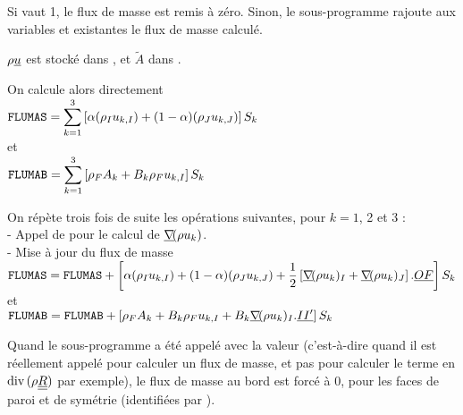 Si  vaut 1, le flux de masse est remis à zéro. Sinon, le
sous-programme rajoute aux variables  et  existantes le
flux de masse calculé.


$\rho\underline{u}$ est stocké dans , et $\tilde{A}$ dans .


On calcule alors directement\\
$\displaystyle \text{\texttt{FLUMAS}}=\sum\limits_{k=1}^{3}\left[
\alpha(\rho_I u_{k,I})+(1-\alpha)(\rho_J u_{k,J})\right]S_k$\\
et\\
$\displaystyle \text{\texttt{FLUMAB}}=\sum\limits_{k=1}^{3}\left[
\rho_F A_k + B_k\rho_Fu_{k,I}\right]S_k$


On répète trois fois de suite les opérations suivantes, pour $k=1$, 2 et 3
:\\
- Appel de  pour le calcul de $\underline{\nabla}\!(\rho u_k)$.\\
- Mise à jour du flux de masse\\
$\displaystyle \text{\texttt{FLUMAS}}=\text{\texttt{FLUMAS}} + \left[
\alpha(\rho_I u_{k,I})+(1-\alpha)(\rho_J u_{k,J})
+\frac{1}{2}\left[\underline{\nabla}\!(\rho u_k)_I+\underline{\nabla}\!(\rho u_k)_J\right]
.\underline{OF}\right]S_k$\\
et\\
$\displaystyle \text{\texttt{FLUMAB}}=\text{\texttt{FLUMAB}}+\left[
\rho_F A_k + B_k\rho_Fu_{k,I}
+B_k\underline{\nabla}\!(\rho u_k)_I.\underline{II^\prime}\right]S_k$


Quand le sous-programme a été appelé avec la valeur 
(c'est-à-dire quand il est réellement appelé pour calculer un flux de
masse, et pas pour calculer le terme en $\text{div}\,(\rho\underline{\underline{R}})$ par exemple), le flux
de masse au bord  est forcé à 0, pour les faces de paroi et de
symétrie (identifiées par ).
